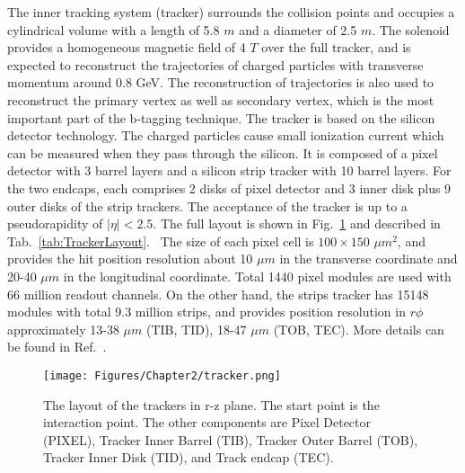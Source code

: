 The inner tracking system (tracker) surrounds the collision points and occupies a cylindrical volume with a length of 5.8 $m$ and a diameter of 2.5 $m$. 
The solenoid provides a homogeneous magnetic field of 4 $T$ over the full tracker,
and is expected to reconstruct the trajectories of charged particles with transverse momentum \pT around 0.8 GeV. %
The reconstruction of trajectories is also used to reconstruct the primary vertex as well as secondary vertex, which is the most important part of the b-tagging technique.
The tracker is based on the silicon detector technology. The charged particles cause small ionization current which can be measured when they pass through the silicon.
It is composed of a pixel detector with 3 barrel layers and a silicon strip tracker with 10 barrel layers.
For the two endcaps, each comprises 2 disks of pixel detector and 3 inner disk plus 9 outer disks of the strip trackers.
The acceptance of the tracker is up to a pseudorapidity of $\vert\eta\vert < 2.5$.
The full layout is shown in Fig.~\ref{fig:CMSTracker} and described in Tab.~\ref{tab:TrackerLayout}.~\cite{1748-0221-9-10-P10009}
The size of each pixel cell is $100 \times 150$ $\mu m^{2}$, and provides the hit position resolution about 10 $\mu m$ in the transverse coordinate and 20-40 $\mu m$ in the longitudinal coordinate.
Total 1440 pixel modules are used with 66 million readout channels.
On the other hand, the strips tracker has 15148 modules with total 9.3 million strips, and provides position resolution in $r\phi$ approximately 13-38 $\mu m$ (TIB, TID), 18-47 $\mu m$ (TOB, TEC).
More details can be found in Ref.~\cite{Karimaki:368412}.

\begin{figure}[t]
  \centering
  \texttt{[image: Figures/Chapter2/tracker.png]}
  \caption{The layout of the trackers in r-z plane. The start point is the interaction point. The other components are Pixel Detector (PIXEL), Tracker Inner Barrel (TIB), Tracker Outer Barrel (TOB), Tracker Inner Disk (TID), and Track endcap (TEC).}
  \label{fig:CMSTracker}
\end{figure}


